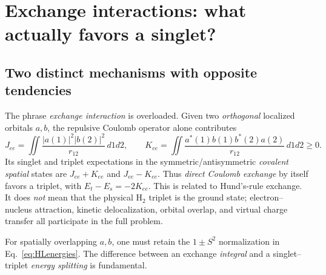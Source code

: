 \documentclass[11pt,letterpaper]{article}
\begin{document}
\section{Exchange interactions: what actually favors a singlet?}
\subsection{Two distinct mechanisms with opposite tendencies}
The phrase \emph{exchange interaction} is overloaded. Given two \emph{orthogonal} localized orbitals $a,b$, the repulsive Coulomb operator alone contributes
\begin{equation}
J_{ee}=\iint\frac{|a(1)|^2|b(2)|^2}{r_{12}}\,d1d2,\qquad
K_{ee}=\iint\frac{a^*(1)b(1)b^*(2)a(2)}{r_{12}}\,d1d2\geq0.
\end{equation}
Its singlet and triplet expectations in the symmetric/antisymmetric \emph{covalent spatial} states are $J_{ee}+K_{ee}$ and $J_{ee}-K_{ee}$. Thus \emph{direct Coulomb exchange} by itself favors a triplet, with $E_t-E_s=-2K_{ee}$. This is related to Hund's-rule exchange. It does \emph{not} mean that the physical $\mathrm H_2$ triplet is the ground state; electron--nucleus attraction, kinetic delocalization, orbital overlap, and virtual charge transfer all participate in the full problem.

For spatially overlapping $a,b$, one must retain the $1\pm S^2$ normalization in Eq.~\eqref{eq:HLenergies}. The difference between an exchange \emph{integral} and a singlet--triplet \emph{energy splitting} is fundamental.
\end{document}
